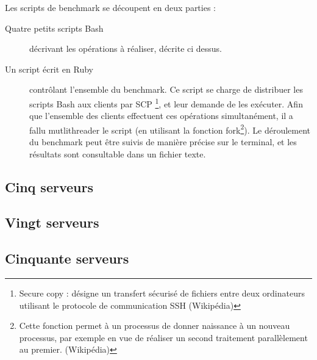 \documentclass[12pt]{report}
\begin{document}
			Les scripts de benchmark se découpent en deux parties :
			\begin{description}
				\item[Quatre petits scripts Bash]décrivant les opérations à réaliser, décrite ci dessus.
				\item[Un script écrit en Ruby] contrôlant l'ensemble du benchmark.
				Ce script se charge de distribuer les scripts Bash aux clients par SCP
				\footnote{Secure copy : désigne un transfert sécurisé de fichiers entre deux ordinateurs utilisant le protocole de communication SSH (Wikipédia)},
				et leur demande de les exécuter. Afin que l'ensemble des clients effectuent ces opérations simultanément, il a fallu mutlithreader le script
				(en utilisant la fonction fork\footnote{Cette fonction permet à un processus de donner naissance à un nouveau processus,
				par exemple en vue de réaliser un second traitement parallèlement au premier. (Wikipédia)}).
				Le déroulement du benchmark peut être suivis de manière précise sur le terminal, et les résultats sont consultable dans un fichier texte.
			\end{description}

			\subsection{Cinq serveurs}

			\subsection{Vingt serveurs}

			\subsection{Cinquante serveurs}

\end{document}
